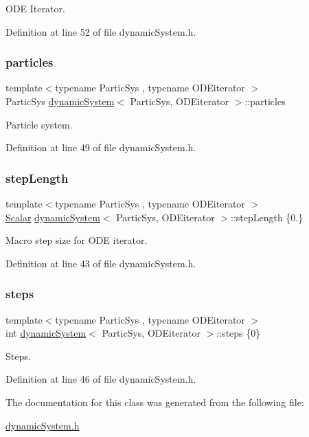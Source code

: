 O\+DE Iterator. 



Definition at line 52 of file dynamic\+System.\+h.

\mbox{\label{classdynamic_system_a809657c0ef63741a7e3d6f32bc87bfe3}} 
\subsubsection{\texorpdfstring{particles}{particles}}
{\footnotesize\ttfamily template$<$typename Partic\+Sys , typename O\+D\+Eiterator $>$ \\
Partic\+Sys \mbox{\hyperlink{classdynamic_system}{dynamic\+System}}$<$ Partic\+Sys, O\+D\+Eiterator $>$\+::particles}



Particle system. 



Definition at line 49 of file dynamic\+System.\+h.

\mbox{\label{classdynamic_system_a3f0e5b7ef17b728c723c67aefa9dbada}} 
\subsubsection{\texorpdfstring{step\+Length}{stepLength}}
{\footnotesize\ttfamily template$<$typename Partic\+Sys , typename O\+D\+Eiterator $>$ \\
\mbox{\hyperlink{classdynamic_system_a6eb7b06a4ee5721a1ee0855a854c3431}{Scalar}} \mbox{\hyperlink{classdynamic_system}{dynamic\+System}}$<$ Partic\+Sys, O\+D\+Eiterator $>$\+::step\+Length \{0.\}}



Macro step size for O\+DE iterator. 



Definition at line 43 of file dynamic\+System.\+h.

\mbox{\label{classdynamic_system_ae9821e179896e6cddbbcc4e706552c57}} 
\subsubsection{\texorpdfstring{steps}{steps}}
{\footnotesize\ttfamily template$<$typename Partic\+Sys , typename O\+D\+Eiterator $>$ \\
int \mbox{\hyperlink{classdynamic_system}{dynamic\+System}}$<$ Partic\+Sys, O\+D\+Eiterator $>$\+::steps \{0\}}



Steps. 



Definition at line 46 of file dynamic\+System.\+h.



The documentation for this class was generated from the following file\+:\begin{DoxyCompactItemize}
\item 
\mbox{\hyperlink{dynamic_system_8h}{dynamic\+System.\+h}}\end{DoxyCompactItemize}
